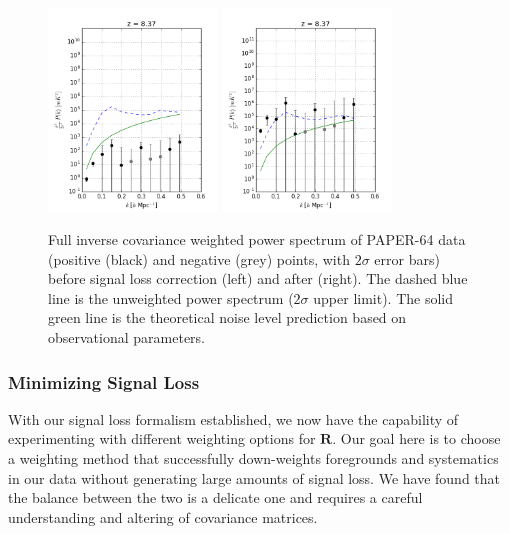 \documentclass[preprint2,numberedappendix,tighten]{aastex6}  %
\begin{document}
\begin{figure}
	\centering
	\includegraphics[width=0.4\textwidth]{plots/ps2_data_nosigloss.png}
	\includegraphics[width=0.4\textwidth]{plots/ps2_data.png}
	\caption{Full inverse covariance weighted power spectrum of PAPER-64 data (positive (black) and negative (grey) points, with $2\sigma$ error bars) before signal loss correction (left) and after (right). The dashed blue line is the unweighted power spectrum ($2\sigma$ upper limit). The solid green line is the theoretical noise level prediction based on observational parameters.}
	\label{fig:ps2_data}
\end{figure}

\subsubsection{Minimizing Signal Loss}
\label{sec:Weight}

With our signal loss formalism established, we now have the capability of experimenting with different weighting options for $\textbf{R}$. Our goal here is to choose a weighting method that successfully down-weights foregrounds and systematics in our data without generating large amounts of signal loss. We have found that the balance between the two is a delicate one and requires a careful understanding and altering of covariance matrices.
\end{document}
